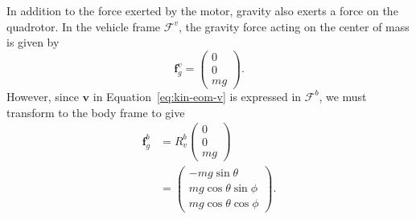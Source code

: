 {In addition to the force exerted by the motor, gravity also exerts a
force on the quadrotor.  In the vehicle frame $\mathcal{F}^v$, the
gravity force acting on the center of mass is given by
\[
\mathbf{f}_g^v = \begin{pmatrix} 0 \\ 0 \\ mg \end{pmatrix}.
\]
However, since $\mathbf{v}$ in Equation~\eqref{eq:kin-eom-v} is expressed
in $\mathcal{F}^b$, we must transform to the body frame to give
\begin{align*}
\mathbf{f}_g^b &= R_{v}^{b} \begin{pmatrix} 0 \\ 0 \\ mg \end{pmatrix} \\
&= \begin{pmatrix}
  -mg\sin\theta \\ mg\cos\theta\sin\phi \\ mg\cos\theta\cos\phi
  \end{pmatrix}.
\end{align*}

}
